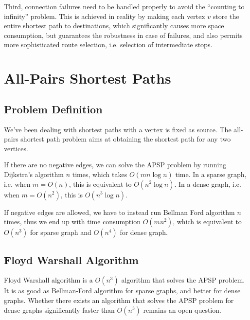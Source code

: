 Third, connection failures need to be handled properly to avoid the ``counting to infinity'' problem. This is achieved in reality by making each vertex $v$ store the entire shortest path to destinations, which significantly causes more space consumption, but guarantees the robustness in case of failures, and also permits more sophisticated route selection, i.e. selection of intermediate stops.
\section{All-Pairs Shortest Paths}
\subsection{Problem Definition}
We've been dealing with shortest paths with a vertex is fixed as source. The all-pairs shortest path problem aims at obtaining the shortest path for any two vertices.
\begin{description}
\end{description}

If there are no negative edges, we can solve the APSP problem by running Dijkstra's algorithm $n$ times, which takes $O(mn\log n)$ time. In a sparse graph, i.e. when $m=O(n)$, this is equivalent to $O(n^2\log n)$. In a dense graph, i.e. when $m=O(n^2)$, this is $O(n^3\log n)$. 

If negative edges are allowed, we have to instead run Bellman Ford algorithm $n$ times, thus we end up with time consumption $O(mn^2)$, which is equivalent to $O(n^3)$ for sparse graph and $O(n^4)$ for dense graph.
\subsection{Floyd Warshall Algorithm}
Floyd Warshall algorithm is a $O(n^3)$ algorithm that solves the APSP problem. It is as good as Bellman-Ford algorithm for sparse graphs, and better for dense graphs. Whether there exists an algorithm that solves the APSP problem for dense graphs significantly faster than $O(n^3)$ remains an open question.

